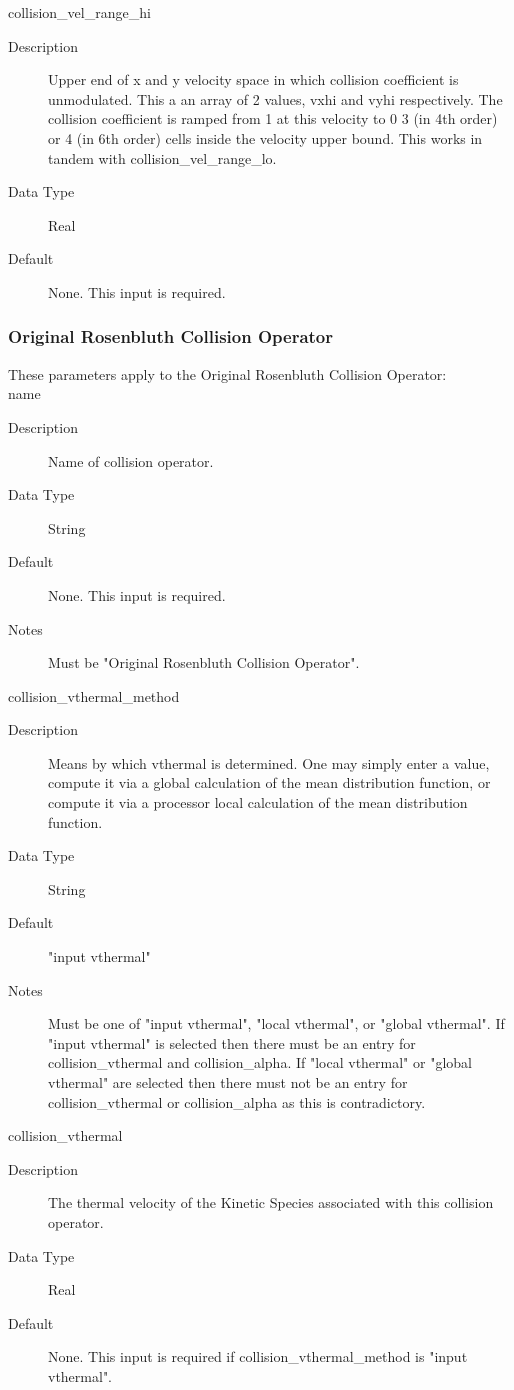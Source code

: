 \documentclass[11pt]{amsart}
\begin{document}
collision\_vel\_range\_hi
\begin{description}
\item [Description] Upper end of x and y velocity space in which collision
coefficient is unmodulated.  This a an array of 2 values, vxhi and vyhi
respectively.  The collision coefficient is ramped from 1 at this velocity to 0
3 (in 4th order) or 4 (in 6th order) cells inside the velocity upper bound.
This works in tandem with collision\_vel\_range\_lo.
\item [Data Type] Real
\item [Default] None.  This input is required.
\end{description}

\subsubsection*{Original Rosenbluth Collision Operator}
These parameters apply to the Original Rosenbluth Collision Operator: \\
\indent name
\begin{description}
\item [Description] Name of collision operator.
\item [Data Type] String
\item [Default] None.  This input is required.
\item [Notes] Must be "Original Rosenbluth Collision Operator".
\end{description}

collision\_vthermal\_method
\begin{description}
\item [Description] Means by which vthermal is determined.  One may simply
enter a value, compute it via a global calculation of the mean distribution
function, or compute it via a processor local calculation of the mean
distribution function.
\item [Data Type] String
\item [Default] "input vthermal"
\item [Notes] Must be one of "input vthermal", "local vthermal", or
"global vthermal".  If "input vthermal" is selected then there must be an entry
for collision\_vthermal and collision\_alpha.  If "local vthermal" or
"global vthermal" are selected then there must not be an entry for
collision\_vthermal or collision\_alpha as this is contradictory.
\end{description}

collision\_vthermal
\begin{description}
\item [Description] The thermal velocity of the Kinetic Species associated with
this collision operator.
\item [Data Type] Real
\item [Default] None.  This input is required if collision\_vthermal\_method is
"input vthermal".
\end{description}
\end{document}
